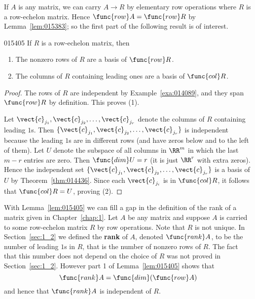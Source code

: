 If $A$ is any matrix, we can carry $A \to R$ by elementary row operations where $R$ is a row-echelon matrix. Hence $\func{row} A = \func{row} R$ by Lemma~\ref{lem:015383}; so the first part of the following result is of interest.

\begin{lemma}{}{015405}
If $R$ is a row-echelon matrix, then

\begin{enumerate}
\item The nonzero rows of $R$ are a basis of $\func{row} R$.

\item The columns of $R$ containing leading ones are a basis of $\func{col} R$.

\end{enumerate}
\end{lemma}

\begin{proof}
The rows of $R$ are independent by Example~\ref{exa:014089}, and they span $\func{row} R$ by definition. This proves (1).

Let $\vect{c}_{j_{1}}, \vect{c}_{j_{2}}, \dots, \vect{c}_{j_{r}}$ denote the columns of $R$ containing leading $1$s. Then $\{\vect{c}_{j_{1}}, \vect{c}_{j_{2}}, \dots, \vect{c}_{j_{r}}\}$ is independent because the leading $1$s are in different rows (and have zeros below and to the left of them). Let $U$ denote the subspace of all columns in $\RR^m$ in which the last $m - r$ entries are zero. Then $\func{dim}U = r$ (it is just $\RR^r$ with extra zeros). Hence the independent set $\{\vect{c}_{j_{1}}, \vect{c}_{j_{2}}, \dots, \vect{c}_{j_{r}}\}$ is a basis of $U$ by Theorem~\ref{thm:014436}. Since each $\vect{c}_{j_{i}}$ is in $\func{col} R$, it follows that $\func{col} R = U$, proving (2).
\end{proof}

With Lemma~\ref{lem:015405} we can fill a gap in the definition of the rank of a matrix given in Chapter~\ref{chap:1}. Let $A$ be any matrix and suppose $A$ is carried to some row-echelon matrix $R$ by row operations. Note that $R$ is not unique. In Section~\ref{sec:1_2} we defined the \textbf{rank} of $A$, denoted $\func{rank} A$, to be the number of leading $1$s in $R$, that is the number of nonzero rows of $R$. The fact that this number does not depend on the choice of $R$ was not proved in Section~\ref{sec:1_2}. However part 1 of Lemma~\ref{lem:015405} shows that
\begin{equation*}
\func{rank } A = \func{dim} (\func{row } A)
\end{equation*}
and hence that $\func{rank} A$ is independent of $R$.

